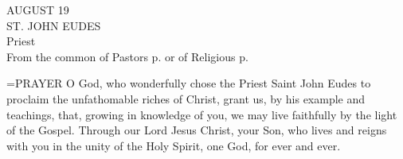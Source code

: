 \begin{center}\normalsize AUGUST 19\\
\footnotesize ST. JOHN EUDES\\
\footnotesize Priest\\
\footnotesize From the common of Pastors p.    or of Religious p. \\
\end{center}

\hangindent=\parindent \small{PRAYER 
O God, who wonderfully chose the Priest Saint John Eudes
to proclaim the unfathomable riches of Christ,
grant us, by his example and teachings,
that, growing in knowledge of you,
we may live faithfully by the light of the Gospel.
Through our Lord Jesus Christ, your Son,
who lives and reigns with you in the unity of the Holy Spirit,
one God, for ever and ever.\\}
 
